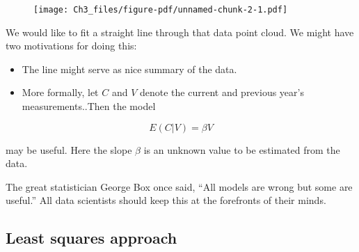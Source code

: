\documentclass[
  letterpaper,
  DIV=11,
  numbers=noendperiod,
  oneside]{scrreprt}
\begin{document}
\begin{figure}[H]

{\centering \texttt{[image: Ch3\_files/figure-pdf/unnamed-chunk-2-1.pdf]}

}

\end{figure}

We would like to fit a straight line through that data point cloud. We
might have two motivations for doing this:

\begin{itemize}
\item
  The line might serve as nice summary of the data.
\item
  More formally, let \(C\) and \(V\) denote the current and previous
  year's measurements..Then the model
\end{itemize}

\[E(C | V) = \beta V\]

may be useful. Here the slope \(\beta\) is an unknown value to be
estimated from the data. {}

\begin{tcolorbox}[enhanced jigsaw, title=\textcolor{quarto-callout-important-color}{\faExclamation}\hspace{0.5em}{Model validity}, toprule=.15mm, titlerule=0mm, colback=white, arc=.35mm, leftrule=.75mm, breakable, bottomtitle=1mm, opacityback=0, coltitle=black, colframe=quarto-callout-important-color-frame, toptitle=1mm, rightrule=.15mm, bottomrule=.15mm, colbacktitle=quarto-callout-important-color!10!white, left=2mm, opacitybacktitle=0.6]

The great statistician George Box once said, ``All models are wrong but
some are useful.'' All data scientists should keep this at the
forefronts of their minds.

\end{tcolorbox}

\hypertarget{least-squares-approach}{%
\subsection{Least squares approach}\label{least-squares-approach}}
\end{document}
